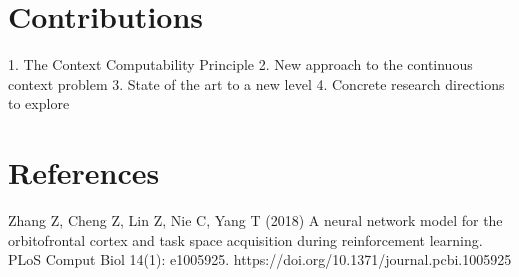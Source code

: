 \documentclass[]{article}
\begin{document}
\section{Contributions}
1. The Context Computability Principle
2. New approach to the continuous context problem
3. State of the art to a new level
4. Concrete research directions to explore

\section{References}
Zhang Z, Cheng Z, Lin Z, Nie C, Yang T (2018) A neural network model for the orbitofrontal cortex and task space acquisition during reinforcement learning. PLoS Comput Biol 14(1): e1005925. https://doi.org/10.1371/journal.pcbi.1005925
\end{document}
